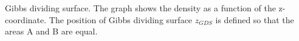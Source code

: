 \label{fig:GDS-def}Gibbs dividing surface. The graph shows the density
as a function of the z-coordinate. The position of Gibbs dividing
surface $z_{GDS}$ is defined so that the areas A and B are equal.